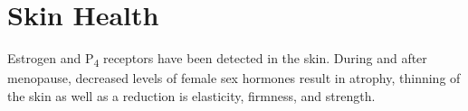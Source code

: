 \documentclass[
	secnumdepth=3, %
]{kaohandt}
\newcommand\tsub[1]{\textsubscript{#1}}
\begin{document}
\section{Skin Health}
Estrogen and P\tsub{4} receptors have been detected in the skin. During and after menopause, decreased levels of female sex hormones result in atrophy, thinning of the skin as well as a reduction is elasticity, firmness, and strength.




\printbibliography[title=Bibliography] %

% 
% 
% 
% 
\end{document}
